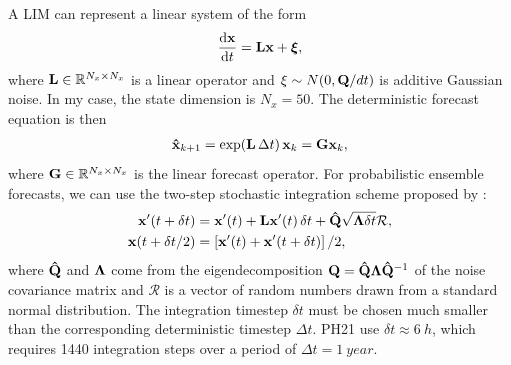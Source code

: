 \documentclass[parskip=half,DIV=16]{scrartcl}
\begin{document}
A \gls{LIM} can represent a linear system of the form
\begin{align*}
    \dv{\vb{x}}{t} = \vb{L}\vb{x} + \vb*{\xi},
\end{align*}
where $\vb{L} \in \mathbb{R}^{N_x \times N_x}$ is a linear operator and $\xi \sim N(0, \vb{Q}/dt)$ is additive Gaussian noise. In my case, the state dimension is $N_x = 50$. The deterministic forecast equation is then~\parencite{Penland1995}
\begin{align*}
    \vu{x}_{k+1} = \exp (\vb{L} \, \Delta t) \, \vb{x}_k  = \vb{G} \vb{x}_k ,
\end{align*}
where $\vb{G} \in \mathbb{R}^{N_x \times N_x}$ is the linear forecast operator. For probabilistic ensemble forecasts, we can use the two-step stochastic integration scheme proposed by \cite{Penland1994}:
\begin{align*}
    \vb{x'}(t+\delta t) &= \vb{x'}(t) + \vb{L}\vb{x'}(t) \, \delta t + \vu{Q} \sqrt{\vb{\Lambda}\delta t} \mathcal{R},
    \\
    \vb{x}(t + \delta t / 2) &= \left[\vb{x'}(t) + \vb{x'}(t+\delta t)\right] / 2,
\end{align*}
where $\vu{Q}$ and $\vb{\Lambda}$ come from the eigendecomposition $\vb{Q} = \vu{Q} \vb{\Lambda}\vu{Q}^{-1}$ of the noise covariance matrix and $\mathcal{R}$ is a vector of random numbers drawn from a standard normal distribution. The integration timestep $\delta t$ must be chosen much smaller than the corresponding deterministic timestep $\Delta t$. PH21 use $\delta t \approx \qty{6}{h}$, which requires 1440 integration steps over a period of $\Delta t = \qty{1}{year}$.
\end{document}
